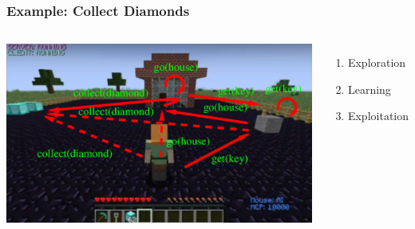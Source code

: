 \documentclass[aspectratio=169]{beamer}
\newcommand{\lpreimp}[1]{\leadsto^{#1}}
\newcommand{\lseqand}[1]{\bigslopedwedge^{#1}}
\begin{document}
\begin{frame}
  \frametitle{Example: Collect Diamonds}


  \begin{columns}
    \column{4.4in}
    \includegraphics[scale=0.33]{pictures/minecraft-all-arrows.png}
    \column{1.7in}
    \begin{enumerate}
    \item Exploration %
    \item Learning %
    \item Exploitation %
    \end{enumerate}
  \end{columns}
\end{frame}





\end{document}
